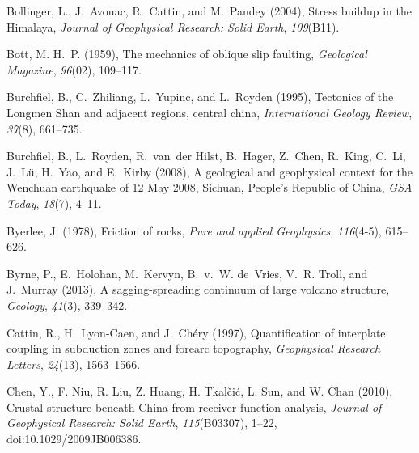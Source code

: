 \documentclass[draft,jgrga]{AGUTeX}
\begin{document}
\begin{article}
\begin{thebibliography}{90}
Bollinger, L., J.~Avouac, R.~Cattin, and M.~Pandey (2004), Stress buildup in
  the {H}imalaya, \textit{Journal of Geophysical Research: Solid Earth},
  \textit{109}(B11).

Bott, M. H.~P. (1959), The mechanics of oblique slip faulting,
  \textit{Geological Magazine}, \textit{96}(02), 109--117.

Burchfiel, B., C.~Zhiliang, L.~Yupinc, and L.~Royden (1995), Tectonics of the
  {L}ongmen {S}han and adjacent regions, central {}china, \textit{International
  Geology Review}, \textit{37}(8), 661--735.

Burchfiel, B., L.~Royden, R.~van~der Hilst, B.~Hager, Z.~Chen, R.~King, C.~Li,
  J.~L{\"u}, H.~Yao, and E.~Kirby (2008), A geological and geophysical context
  for the {W}enchuan earthquake of 12 {M}ay 2008, {S}ichuan, {P}eople's
  {R}epublic of {C}hina, \textit{GSA Today}, \textit{18}(7), 4--11.

Byerlee, J. (1978), Friction of rocks, \textit{Pure and applied Geophysics},
  \textit{116}(4-5), 615--626.

Byrne, P., E.~Holohan, M.~Kervyn, B.~v.~W. de~Vries, V.~R. Troll, and J.~Murray
  (2013), A sagging-spreading continuum of large volcano structure,
  \textit{Geology}, \textit{41}(3), 339--342.

Cattin, R., H.~Lyon-Caen, and J.~Ch{\'e}ry (1997), Quantification of interplate
  coupling in subduction zones and forearc topography, \textit{Geophysical
  Research Letters}, \textit{24}(13), 1563--1566.

Chen, Y., F. Niu, R. Liu, Z. Huang, H. Tkal{\v{c}}i{\'c}, L. Sun, and
  W. Chan (2010), Crustal structure beneath {C}hina from receiver function
  analysis, \textit{Journal of Geophysical Research: Solid Earth}, 
  \textit{115}(B03307), 1--22, doi:10.1029/2009JB006386.


\end{thebibliography}
\end{article}
\end{document}

